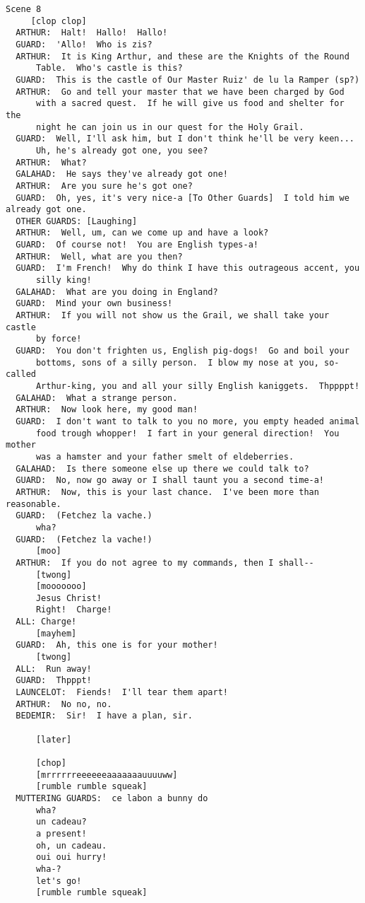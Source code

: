 \documentclass{article}
\begin{document}
\begin{verbatim}
Scene 8
     [clop clop]
  ARTHUR:  Halt!  Hallo!  Hallo!
  GUARD:  'Allo!  Who is zis?
  ARTHUR:  It is King Arthur, and these are the Knights of the Round
      Table.  Who's castle is this?
  GUARD:  This is the castle of Our Master Ruiz' de lu la Ramper (sp?)
  ARTHUR:  Go and tell your master that we have been charged by God
      with a sacred quest.  If he will give us food and shelter for the
      night he can join us in our quest for the Holy Grail.
  GUARD:  Well, I'll ask him, but I don't think he'll be very keen...
      Uh, he's already got one, you see?
  ARTHUR:  What?
  GALAHAD:  He says they've already got one!
  ARTHUR:  Are you sure he's got one?
  GUARD:  Oh, yes, it's very nice-a [To Other Guards]  I told him we already got one.
  OTHER GUARDS: [Laughing]
  ARTHUR:  Well, um, can we come up and have a look?
  GUARD:  Of course not!  You are English types-a!
  ARTHUR:  Well, what are you then?
  GUARD:  I'm French!  Why do think I have this outrageous accent, you
      silly king!
  GALAHAD:  What are you doing in England?
  GUARD:  Mind your own business!
  ARTHUR:  If you will not show us the Grail, we shall take your castle
      by force!
  GUARD:  You don't frighten us, English pig-dogs!  Go and boil your
      bottoms, sons of a silly person.  I blow my nose at you, so-called
      Arthur-king, you and all your silly English kaniggets.  Thppppt!
  GALAHAD:  What a strange person.
  ARTHUR:  Now look here, my good man!
  GUARD:  I don't want to talk to you no more, you empty headed animal
      food trough whopper!  I fart in your general direction!  You mother
      was a hamster and your father smelt of eldeberries.
  GALAHAD:  Is there someone else up there we could talk to?
  GUARD:  No, now go away or I shall taunt you a second time-a!
  ARTHUR:  Now, this is your last chance.  I've been more than reasonable.
  GUARD:  (Fetchez la vache.)
      wha?
  GUARD:  (Fetchez la vache!)
      [moo]
  ARTHUR:  If you do not agree to my commands, then I shall--
      [twong]
      [mooooooo]
      Jesus Christ!
      Right!  Charge!
  ALL: Charge!
      [mayhem]
  GUARD:  Ah, this one is for your mother!
      [twong]
  ALL:  Run away!
  GUARD:  Thpppt!
  LAUNCELOT:  Fiends!  I'll tear them apart!
  ARTHUR:  No no, no.
  BEDEMIR:  Sir!  I have a plan, sir.

      [later]

      [chop]
      [mrrrrrreeeeeeaaaaaaauuuuww]
      [rumble rumble squeak]
  MUTTERING GUARDS:  ce labon a bunny do
      wha?
      un cadeau?
      a present!
      oh, un cadeau.
      oui oui hurry!
      wha-?
      let's go!
      [rumble rumble squeak]


\end{verbatim}
\end{document}
